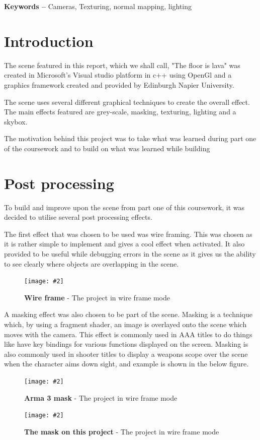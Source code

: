 \documentclass[10pt, a4paper]{article}
\title{\mytitle}
\author{\myauthor\hspace{1em}\\\contact\\Edinburgh Napier University\hspace{0.5em}-\hspace{0.5em}\mymodule}
\date{}
\newcommand{\figuremacro}[5]{
    \begin{figure}[#1]
        \centering
        \texttt{[image: \#2]}
        \caption[#3]{\textbf{#3}#4}
        \label{fig:#2}
    \end{figure}
}
\begin{document}
	\maketitle
	\begin{abstract}
	This report will outline the creation and implementation
	of a graphics coursework project. The aim of this project
	was to create a "the floor is lava" type scene, essentially
	a living room which has a floor made of lava.
	
	\end{abstract}
    
	\textbf{Keywords -- }{Cameras, Texturing, normal mapping, lighting}
	\section{Introduction}
	The scene featured in this report, which we shall call, "The floor is lava" was created in Microsoft's Visual studio platform in c++ using OpenGl and a graphics framework created and provided by Edinburgh Napier University. 
	
	The scene uses several different graphical techniques to create the overall effect. The main effects featured are grey-scale, masking, texturing, lighting and a skybox.
	
	The motivation behind this project was to take what was learned during part one of the coursework and to build on what was learned while building 
\section{Post processing}

To build and improve upon the scene from part one of this coursework, it was decided to utilise several post processing effects.  

The first effect that was chosen to be used was wire framing. This was chosen as it is rather simple to implement and gives a cool effect when activated. It also provided to be useful while debugging errors in the scene as it gives us the ability to see clearly where objects are overlapping in the scene.

\figuremacro{h}{wireframe.png}{Wire frame}{ - The project in wire frame mode}{0.65}

A masking effect was also chosen to be part of the scene. Masking is a technique which, by using a fragment shader, an image is overlayed onto the scene which moves with the camera. This effect is commonly used in AAA titles to do things like have key bindings for various functions displayed on the screen. Masking is also commonly used in shooter titles to display a weapons scope over the scene when the character aims down sight, and example is shown in the below figure.
\figuremacro{h}{armamask.jpg}{Arma 3 mask}{ - The project in wire frame mode}{1.0}
\figuremacro{h}{mask.png}{The mask on this project}{ - The project in wire frame mode}{1.0}
\end{document}

